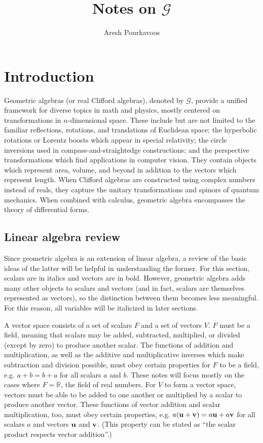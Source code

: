 \documentclass{article}
\begin{document}
\title{Notes on $\mathcal{G}$}
\author{Aresh Pourkavoos}
\date{}
\maketitle

\tableofcontents
\newpage

\section{Introduction}
Geometric algebras (or real Clifford algebras),
denoted by $\mathcal{G}$, provide a unified framework
for diverse topics in math and physics,
mostly centered on transformations in $n$-dimensional space.
These include but are not limited to
the familiar reflections, rotations, and translations of Euclidean space;
the hyperbolic rotations or Lorentz boosts which appear in special relativity;
the circle inversions used in compass-and-straightedge constructions;
and the perspective transformations which find applications in computer vision.
They contain objects which represent area, volume, and beyond
in addition to the vectors which represent length.
When Clifford algebras are constructed using complex numbers instead of reals,
they capture the unitary transformations and spinors of quantum mechanics.
When combined with calculus, geometric algebra encompasses the theory of differential forms.

\subsection{Linear algebra review}

Since geometric algebra is an extension of linear algebra,
a review of the basic ideas of the latter
will be helpful in understanding the former.
For this section, scalars are in italics and vectors are in bold.
However, geometric algebra adds many other objects to scalars and vectors
(and in fact, scalars are themselves represented as vectors),
so the distinction between them becomes less meaningful.
For this reason, all variables will be italicized in later sections.

A vector space consists of a set of scalars $F$ and a set of vectors $V$.
$F$ must be a field, meaning that
scalars may be added, subtracted, multiplied, or divided
(except by zero) to produce another scalar.
The functions of addition and multiplication,
as well as the additive and multiplicative inverses
which make subtraction and division possible,
must obey certain properties for $F$ to be a field,
e.g. $a+b=b+a$ for all scalars $a$ and $b$.
These notes will focus mostly on the cases
where $F=\mathbb{R}$, the field of real numbers.
For $V$ to form a vector space,
vectors must be able to be added to one another
or multiplied by a scalar to produce another vector.
These functions of vector addition and scalar multiplication, too,
must obey certain properties,
e.g. $a(\vb{u}+\vb{v}) = a\vb{u}+a\vb{v}$
for all scalars $a$ and vectors $\vb{u}$ and $\vb{v}$.
(This property can be stated as
``the scalar product respects vector addition''.)
\end{document}
